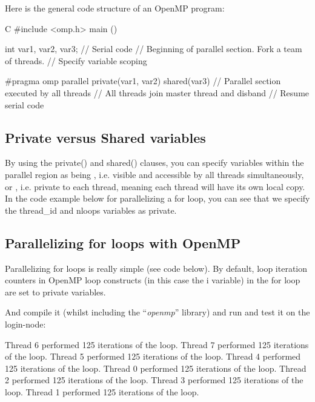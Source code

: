Here is the general code structure of an OpenMP program:

\begin{code}{C}
#include <omp.h>
main ()  {
int var1, var2, var3;
// Serial code
// Beginning of parallel section. Fork a team of threads.
// Specify variable scoping

#pragma omp parallel private(var1, var2) shared(var3)
  {
  // Parallel section executed by all threads
  // All threads join master thread and disband
  }
// Resume serial code
}
\end{code}

\subsection{Private versus Shared variables}

By using the private() and shared() clauses, you can specify variables within
the parallel region as being , i.e. visible and accessible by
all threads simultaneously, or , i.e. private to each thread,
meaning each thread will have its own local copy. In the code example below for
parallelizing a for loop, you can see that we specify the thread\_id and nloops
variables as private.

\subsection{Parallelizing for loops with OpenMP}

Parallelizing for loops is really simple (see code below). By default, loop
iteration counters in OpenMP loop constructs (in this case the i variable) in
the for loop are set to private variables.


And compile it (whilst including the ``\emph{openmp}'' library) and run and test it on the login-node:

\begin{prompt}
Thread 6 performed 125 iterations of the loop.
Thread 7 performed 125 iterations of the loop.
Thread 5 performed 125 iterations of the loop.
Thread 4 performed 125 iterations of the loop.
Thread 0 performed 125 iterations of the loop.
Thread 2 performed 125 iterations of the loop.
Thread 3 performed 125 iterations of the loop.
Thread 1 performed 125 iterations of the loop.
\end{prompt}

